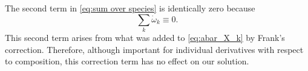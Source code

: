   The second term in \eqref{eq:sum over species} is identically zero because
  \[
  \sum_k \dot{\omega}_k \equiv 0.
  \]
  This second term arises from what was added to \eqref{eq:abar_X_k} by 
  Frank's correction.  Therefore, although important for individual derivatives
  with respect to composition, this correction term has no effect on our 
  solution.
